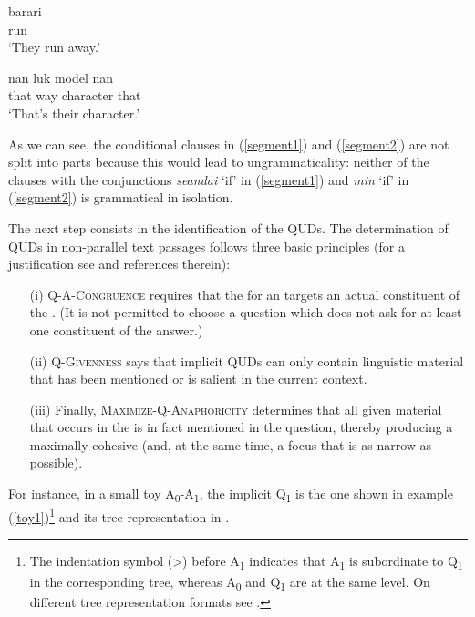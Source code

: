 \documentclass[output=paper
,modfonts
,nonflat]{langsci/langscibook}
\begin{document}
\begin{exe}
	\ex\label{segment3}
	\begin{xlist}
		\gll barari\\
		run\\
		\glt `They run away.'
	\end{xlist}
\end{exe}

\begin{exe}
	\ex\label{segment4}
	\begin{xlist}
		\exi{A:}
		\gll nan	luk	model	nan\\
		that	way	character	that\\
		\glt `That's their character.'
	\end{xlist}
\end{exe}

\noindent As we can see, the conditional clauses in (\ref{segment1}) and (\ref{segment2}) are not split into parts because this would lead to ungrammaticality: neither of the clauses with the conjunctions \textit{seandai} `if' in (\ref{segment1}) and \textit{min} `if' in (\ref{segment2}) is grammatical in isolation. 

The next step consists in the identification of the QUDs. The determination of QUDs in non-parallel text passages follows three basic principles (for a justification see \citealt{riear17b} and references therein):
\begin{itemize}
	\item[(i)] \textsc{Q-A-Congruence} requires that the  for an  targets an actual constituent of the . (It is not permitted to choose a question which does not ask for at least one constituent of the answer.)
	\item[(ii)] \textsc{Q-Givenness} says that implicit QUDs can only contain linguistic material that has been mentioned or is salient in the current  context.
	\item[(iii)] Finally, \textsc{Maximize-Q-Anaphoricity} determines that all given material that occurs in the  is in fact mentioned in the question, thereby producing a maximally cohesive  (and, at the same time, a focus that is as narrow as possible).
\end{itemize}

\noindent For instance, in a small toy  A\textsubscript{0}-A\textsubscript{1}, the implicit  Q\textsubscript{1} is the one shown in example (\ref{toy1})\footnote{The indentation symbol (>) before A\textsubscript{1} indicates that A\textsubscript{1} is subordinate to Q\textsubscript{1} in the corresponding  tree, whereas A\textsubscript{0} and Q\textsubscript{1} are at the same level. On different tree representation formats see \citet{riear18}.} and its tree representation in .
\end{document}
